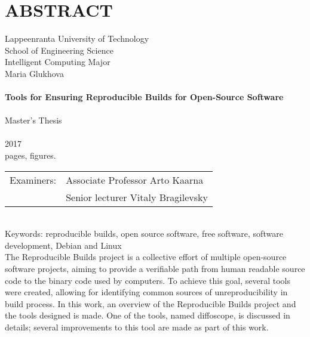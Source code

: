 \section*{ABSTRACT}

Lappeenranta University of Technology\\
School of Engineering Science\\
Intelligent Computing Major\\


Maria Glukhova\\
\\
\textbf{Tools for Ensuring Reproducible Builds for Open-Source Software}\\
\\
Master's Thesis\\
\\
2017\\
\pageref{LastPage} pages, \totalfigures{} figures.\\


\begin{tabular}{l p{11.0cm}}  
  
Examiners: & Associate Professor \foreignlanguage{finnish}{Arto Kaarna}\\
& Senior lecturer Vitaly Bragilevsky\\

\end {tabular}\\

Keywords: reproducible builds, open source software, free software, software development, Debian and Linux\\


The Reproducible Builds project is a collective effort of multiple open-source software
projects, aiming to provide a verifiable path from human readable source code
to the binary code used by computers. To achieve this goal, several tools were
created, allowing for identifying common sources of unreproducibility in build
process.
In this work, an overview of the Reproducible Builds project and the tools designed is made. One of the tools, named diffoscope, is discussed in details; several improvements to this tool are made as part of this work.\\
